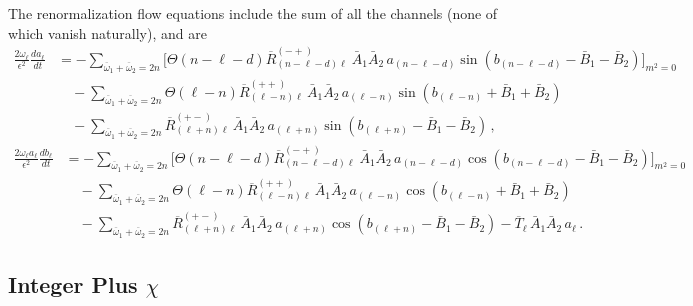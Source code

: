 \documentclass[letterpaper,11pt]{article}
\newcommand{\ol}{\omega_\ell}
\newcommand{\oone}{\overline{\omega}_1}
\newcommand{\otwo}{\overline{\omega}_2}
\begin{document}
The renormalization flow equations include the sum of all the channels (none of which vanish naturally), and are
\begin{align}
\frac{2 \ol}{\epsilon^2} \frac{d a_\ell}{d t} &= - \!\!\!\! \sum_{\oone + \otwo = 2n}\bigg[ \Theta\left( n - \ell - d \right) \overline{R}^{(-+)}_{(n - \ell - d) \ell} \ \bar A_1 \bar A_2 \, a_{(n - \ell - d)} \sin \left( b_{(n - \ell - d)} - \bar B_1 - \bar B_2 \right) \bigg]_{m^2 = 0}  \nonumber \\ 
%
& \quad - \!\!\!\! \sum_{\oone + \otwo = 2n} \!\!\!\! \Theta \left( \ell - n \right)  \overline{R}^{(++)}_{(\ell - n)\ell} \, \bar A_1 \bar A_2 \, a_{(\ell - n)} \sin \left( b_{(\ell - n)} + \bar B_1 + \bar B_2 \right) \nonumber \\
%
& \quad  - \!\!\!\! \sum_{\oone + \otwo = 2n} \!\!\!\! \overline{R}^{(+-)}_{(\ell + n) \ell} \, \bar A_1 \bar A_2 \, a_{(\ell + n)} \sin \left( b_{(\ell + n)} - \bar B_1 - \bar B_2 \right) \, ,
\end{align}
\begin{align}
\frac{2 \ol a_\ell}{\epsilon^2} \frac{d b_\ell}{d t} &= - \!\!\!\! \sum_{\oone + \otwo = 2n}\bigg[ \Theta\left( n - \ell - d \right) \overline{R}^{(-+)}_{(n - \ell - d) \ell} \ \bar A_1 \bar A_2 \, a_{(n - \ell - d)} \cos \left( b_{(n - \ell - d)} - \bar B_1 - \bar B_2 \right) \bigg]_{m^2 = 0}  \nonumber \\ 
%
& \quad - \!\!\!\! \sum_{\oone + \otwo = 2n} \!\!\!\! \Theta \left( \ell - n \right)  \overline{R}^{(++)}_{(\ell - n)\ell} \, \bar A_1 \bar A_2 \, a_{(\ell - n)} \cos \left( b_{(\ell - n)} + \bar B_1 + \bar B_2 \right) \nonumber \\
%
& \quad  - \!\!\!\! \sum_{\oone + \otwo = 2n} \!\!\!\! \overline{R}^{(+-)}_{(\ell + n) \ell} \, \bar A_1 \bar A_2 \, a_{(\ell + n)} \cos \left( b_{(\ell + n)} - \bar B_1 - \bar B_2 \right) - \overline{T}_{\ell} \, \bar A_1 \bar A_2 \, a_\ell \, .
\end{align}

\subsection{Integer Plus $\chi$}
\label{ssec: intpluschi}
\end{document}
